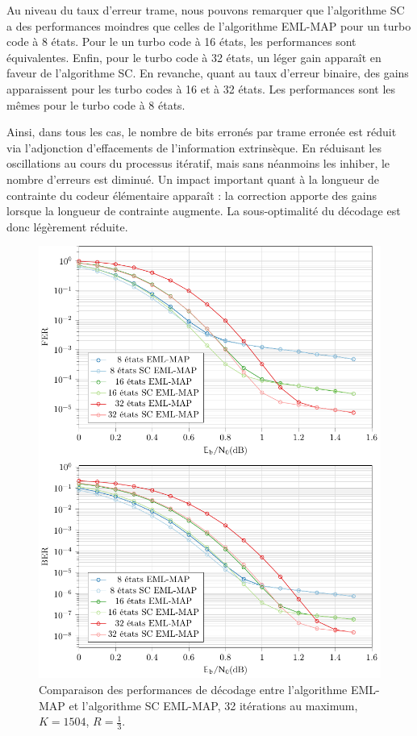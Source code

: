 Au niveau du taux d'erreur trame, nous pouvons remarquer que l'algorithme SC a des performances moindres que celles de
l'algorithme EML-MAP pour un turbo code à 8 états. Pour le un turbo code à 16 états, les performances sont équivalentes. 
Enfin, pour le turbo code à 32 états, un léger gain apparaît en faveur de l'algorithme SC.
En revanche, quant au taux d'erreur binaire, des gains apparaissent pour les turbo codes à 16 et à 32 états. Les performances 
sont les mêmes pour le turbo code à 8 états.

Ainsi, dans tous les cas, le nombre de bits erronés par trame erronée est réduit via l'adjonction \og d'effacements \fg 
de l'information extrinsèque. En réduisant les oscillations au cours du processus itératif, mais sans néanmoins les inhiber,
le nombre d'erreurs est diminué. Un impact important quant à la longueur de contrainte du codeur élémentaire apparaît :
la correction apporte des gains lorsque la longueur de contrainte augmente. La sous-optimalité du décodage est donc légèrement réduite. 

\begin{figure}[!ht]
\vspace*{-.2cm}
	\centering
	\includegraphics[width=.8\textwidth]{main/ch2_fig/tikz/sc_32it.pdf}
	\caption{Comparaison des performances de décodage entre l'algorithme EML-MAP et l'algorithme SC EML-MAP, 32 itérations au maximum, $K=1504$, $R=\frac{1}{3}$.\label{fig:sc32it}}
\vspace*{-2ex}
\end{figure}

